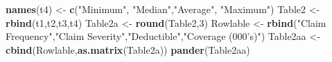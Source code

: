 \documentclass[]{book}
\newenvironment{Shaded}{\begin{snugshade}}{\end{snugshade}}
\newcommand{\KeywordTok}[1]{\textcolor[rgb]{0.13,0.29,0.53}{\textbf{#1}}}
\newcommand{\DecValTok}[1]{\textcolor[rgb]{0.00,0.00,0.81}{#1}}
\newcommand{\StringTok}[1]{\textcolor[rgb]{0.31,0.60,0.02}{#1}}
\newcommand{\NormalTok}[1]{#1}
\theoremstyle{definition}
\theoremstyle{definition}
\theoremstyle{definition}
\theoremstyle{remark}
\begin{document}
\begin{Shaded}
\begin{Highlighting}[]
\KeywordTok{names}\NormalTok{(t4) <-}\StringTok{ }\KeywordTok{c}\NormalTok{(}\StringTok{"Minimum"}\NormalTok{, }\StringTok{"Median"}\NormalTok{,}\StringTok{"Average"}\NormalTok{, }\StringTok{"Maximum"}\NormalTok{)}
\NormalTok{Table2 <-}\StringTok{ }\KeywordTok{rbind}\NormalTok{(t1,t2,t3,t4)}
\NormalTok{Table2a <-}\StringTok{ }\KeywordTok{round}\NormalTok{(Table2,}\DecValTok{3}\NormalTok{)}
\NormalTok{Rowlable <-}\StringTok{ }\KeywordTok{rbind}\NormalTok{(}\StringTok{"Claim Frequency"}\NormalTok{,}\StringTok{"Claim Severity"}\NormalTok{,}\StringTok{"Deductible"}\NormalTok{,}\StringTok{"Coverage (000's)"}\NormalTok{)}
\NormalTok{Table2aa <-}\StringTok{ }\KeywordTok{cbind}\NormalTok{(Rowlable,}\KeywordTok{as.matrix}\NormalTok{(Table2a))}
\KeywordTok{pander}\NormalTok{(Table2aa)}
\end{Highlighting}
\end{Shaded}
\end{document}

